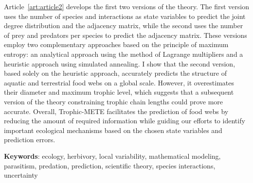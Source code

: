 \documentclass[12pt,twoside,phd]{dms}
\numberwithin{equation}{section}
\numberwithin{table}{chapter}
\numberwithin{figure}{chapter}
\begin{document}
Article~\ref{art:article2} develops the first two versions of the theory. The
first version uses the number of species and interactions as state variables to
predict the joint degree distribution and the adjacency matrix, while the second
uses the number of prey and predators per species to predict the adjacency
matrix. These versions employ two complementary approaches based on the
principle of maximum entropy: an analytical approach using the method of
Lagrange multipliers and a heuristic approach using simulated annealing. I show
that the second version, based solely on the heuristic approach, accurately
predicts the structure of aquatic and terrestrial food webs on a global scale.
However, it overestimates their diameter and maximum trophic level, which
suggests that a subsequent version of the theory constraining trophic chain
lengths could prove more accurate. Overall, Trophic-METE facilitates the
prediction of food webs by reducing the amount of required information while
guiding our efforts to identify important ecological mechanisms based on the
chosen state variables and prediction errors.

\textbf{Keywords}: ecology, herbivory, local variability, mathematical modeling,
parasitism, predation, prediction, scientific theory, species interactions,
uncertainty


\francais
\cleardoublepage
{}  %

\setlength{\parskip}{0pt} %

\tableofcontents
\cleardoublepage
{}  %
\listoftables
\cleardoublepage
{}
\listoffigures
\end{document}

